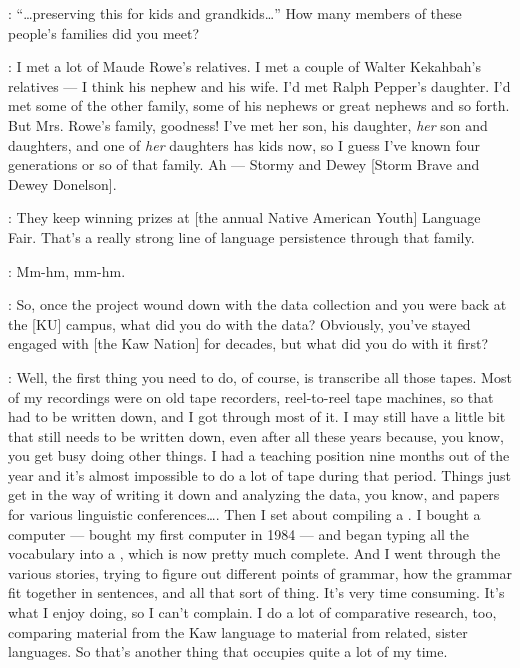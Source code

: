\documentclass[output=paper]{LSP/langsci}
\begin{document}
: ``\ldots preserving this for kids and grandkids\ldots'' How many members of these people's families did you meet?

:  I met a lot of Maude Rowe's relatives. I met a couple of Walter Kekahbah's relatives --- I think his nephew and his wife. I'd met Ralph Pepper's daughter. I'd met some of the other family, some of his nephews or great nephews and so forth. But Mrs. Rowe's family, goodness! I've met her son, his daughter, \textit{her} son and daughters, and one of \textit{her} daughters has kids now, so I guess I've known four generations or so of that family. Ah --- Stormy and Dewey [Storm Brave and Dewey Donelson].

: They keep winning prizes at [the annual Native American Youth] Language Fair. That's a really strong line of language persistence through that family.

: Mm-hm, mm-hm.

: So, once the project wound down with the data collection and you were back at the [KU] campus, what did you do with the data? Obviously, you've stayed engaged with [the Kaw Nation] for decades, but what did you do with it first?

: Well, the first thing you need to do, of course, is transcribe all those tapes. Most of my recordings were on old tape recorders, reel-to-reel tape machines, so that had to be written down, and I got through most of it. I may still have a little bit that still needs to be written down, even after all these years because, you know, you get busy doing other things. I had a teaching position nine months out of the year and it's almost impossible to do a lot of tape  during that period. Things just get in the way of writing it down and analyzing the data, you know, and papers for various linguistic conferences{\ldots}. Then I set about compiling a . I bought a computer --- bought my first computer in 1984 --- and began typing all the vocabulary into a , which is now pretty much complete. And I went through the various stories, trying to figure out different points of grammar, how the grammar fit together in sentences, and all that sort of thing. It's very time consuming. It's what I enjoy doing, so I can't complain. I do a lot of comparative research, too, comparing material from the Kaw language to material from related, sister languages. So that's another thing that occupies quite a lot of my time.
\end{document}
